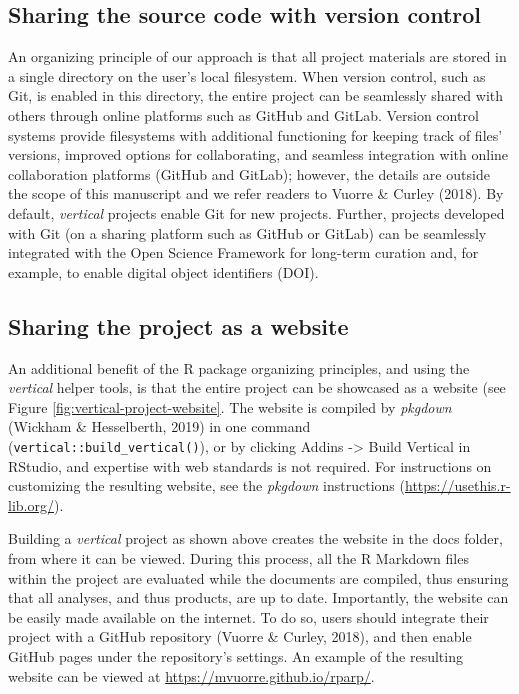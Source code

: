 \documentclass[
  english,
  jou,floatsintext]{apa6}
\begin{document}
\hypertarget{sharing-the-source-code-with-version-control}{%
\subsection{Sharing the source code with version control}\label{sharing-the-source-code-with-version-control}}

An organizing principle of our approach is that all project materials are stored in a single directory on the user's local filesystem. When version control, such as Git, is enabled in this directory, the entire project can be seamlessly shared with others through online platforms such as GitHub and GitLab. Version control systems provide filesystems with additional functioning for keeping track of files' versions, improved options for collaborating, and seamless integration with online collaboration platforms (GitHub and GitLab); however, the details are outside the scope of this manuscript and we refer readers to Vuorre \& Curley (2018). By default, \emph{vertical} projects enable Git for new projects. Further, projects developed with Git (on a sharing platform such as GitHub or GitLab) can be seamlessly integrated with the Open Science Framework for long-term curation and, for example, to enable digital object identifiers (DOI).

\hypertarget{sharing-the-project-as-a-website}{%
\subsection{Sharing the project as a website}\label{sharing-the-project-as-a-website}}

An additional benefit of the R package organizing principles, and using the \emph{vertical} helper tools, is that the entire project can be showcased as a website (see Figure \ref{fig:vertical-project-website}. The website is compiled by \emph{pkgdown} (Wickham \& Hesselberth, 2019) in one command (\texttt{vertical::build\_vertical()}), or by clicking Addins -\textgreater{} Build Vertical in RStudio, and expertise with web standards is not required. For instructions on customizing the resulting website, see the \emph{pkgdown} instructions (\url{https://usethis.r-lib.org/}).

Building a \emph{vertical} project as shown above creates the website in the docs folder, from where it can be viewed. During this process, all the R Markdown files within the project are evaluated while the documents are compiled, thus ensuring that all analyses, and thus products, are up to date. Importantly, the website can be easily made available on the internet. To do so, users should integrate their project with a GitHub repository (Vuorre \& Curley, 2018), and then enable GitHub pages under the repository's settings. An example of the resulting website can be viewed at \url{https://mvuorre.github.io/rparp/}.
\end{document}
